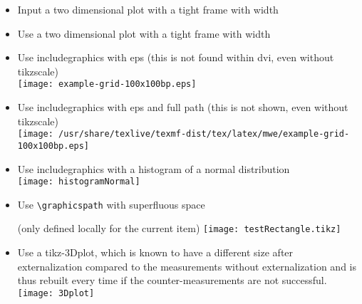 \documentclass[twocolumn]{article}
\begin{document}
\begin{itemize}
			\item Input a two dimensional plot with a tight frame with width \newlength{\mylen}\settowidth{\mylen}{\frame{}}\the\mylen\\%
				\frame{}
			\item Use a two dimensional plot with a tight frame with width \the\mylen\\%
		\else
			\item Use includegraphics with eps (this is not found within dvi, even without tikzscale)\\%
				\texttt{[image: example-grid-100x100bp.eps]}%
			\item Use includegraphics with eps and full path (this is not shown, even without tikzscale)\\%
				\texttt{[image: /usr/share/texlive/texmf-dist/tex/latex/mwe/example-grid-100x100bp.eps]}%
		\fi
		\item Use includegraphics with a histogram of a normal distribution\\%
			\texttt{[image: histogramNormal]}%
		\item {Use \texttt{\textbackslash graphicspath} with superfluous space\graphicspath{{somefolder} } (only defined locally for the current item)
			\texttt{[image: testRectangle.tikz]}}%
		\item Use a tikz-3Dplot, which is known to have a different size after externalization compared to the measurements without externalization and is thus rebuilt every time if the counter-measurements are not successful.\\%
			\texttt{[image: 3Dplot]}
	\end{itemize}
\end{document}
